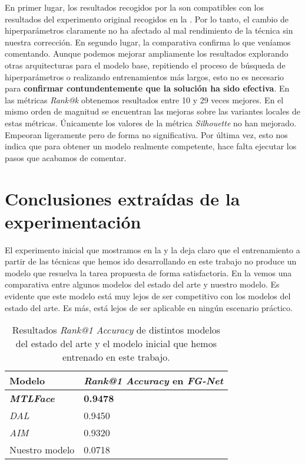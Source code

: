 En primer lugar, los resultados recogidos por la  son compatibles con los resultados del experimento original recogidos en la . Por lo tanto, el cambio de hiperparámetros claramente no ha afectado al mal rendimiento de la técnica sin nuestra corrección. En segundo lugar, la comparativa confirma lo que veníamos comentando. Aunque podemos mejorar ampliamente los resultados explorando otras arquitecturas para el modelo base, repitiendo el proceso de búsqueda de hiperparámetros o realizando entrenamientos más largos, esto no es necesario para \textbf{confirmar contundentemente que la solución ha sido efectiva}. En las métricas \textit{Rank@k} obtenemos resultados entre 10 y 29 veces mejores. En el mismo orden de magnitud se encuentran las mejoras sobre las variantes locales de estas métricas. Únicamente los valores de la métrica \textit{Silhouette} no han mejorado. Empeoran ligeramente pero de forma no significativa. Por última vez, esto nos indica que para obtener un modelo realmente competente, hace falta ejecutar los pasos que acabamos de comentar.

\section{Conclusiones extraídas de la experimentación} \label{isec:conclusiones_experimentacion}

El experimento inicial que mostramos en la  y la  deja claro que el entrenamiento a partir de las técnicas que hemos ido desarrollando en este trabajo no produce un modelo que resuelva la tarea propuesta de forma satisfactoria. En la  vemos una comparativa entre algunos modelos del estado del arte y nuestro modelo. Es evidente que este modelo está muy lejos de ser competitivo con los modelos del estado del arte. Es más, está lejos de ser aplicable en ningún escenario práctico.

\begin{table}[!hbtp]
\centering
\begin{tabular}{|l|l|}
    \hline
    Modelo                    & \textit{Rank@1 Accuracy} en \textit{FG-Net} \\
    \hline

    \textbf{\textit{MTLFace}} & \textbf{0.9478}                              \\
    \textit{DAL}              & 0.9450                                       \\
    \textit{AIM}              & 0.9320                                      \\
    Nuestro modelo            & 0.0718                                      \\
    \hline

\end{tabular}
\caption{Resultados \textit{Rank@1 Accuracy} de distintos modelos del estado del arte y el modelo inicial que hemos entrenado en este trabajo.}
\label{table:estado_del_arte_y_mi_modelo}
\end{table}

